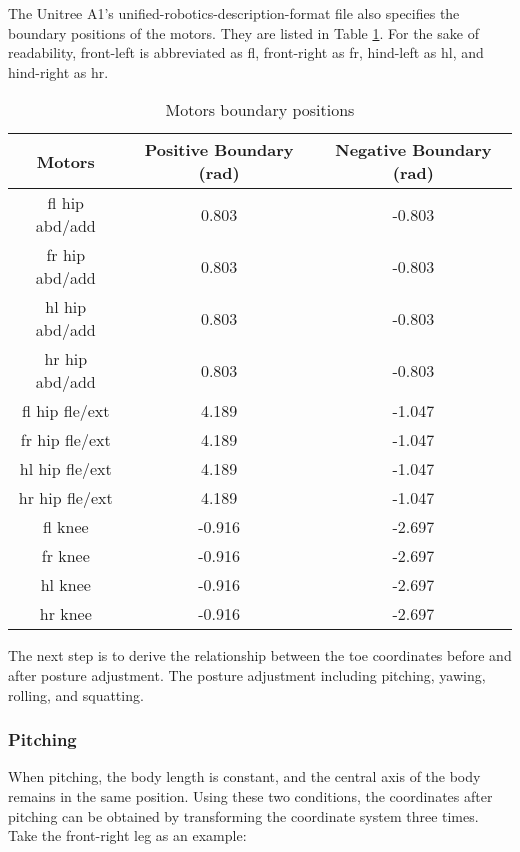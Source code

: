 The Unitree A1's unified-robotics-description-format file also specifies the boundary positions of the motors. They are listed in Table \ref{table:motors_boundary_positions}. For the sake of readability, front-left is abbreviated as fl, front-right as fr, hind-left as hl, and hind-right as hr.

\begin{table}[htbp]
   \centering
   \caption{Motors boundary positions}
   \begin{tabular}{|c|c|c|}
   \hline
   Motors & Positive Boundary (rad) & Negative Boundary (rad) \\ \hline
   fl hip abd/add &  0.803 & -0.803 \\ \hline
   fr hip abd/add &  0.803 & -0.803 \\ \hline
   hl hip abd/add &  0.803 & -0.803 \\ \hline
   hr hip abd/add &  0.803 & -0.803 \\ \hline
   fl hip fle/ext &  4.189 & -1.047 \\ \hline
   fr hip fle/ext &  4.189 & -1.047 \\ \hline
   hl hip fle/ext &  4.189 & -1.047 \\ \hline
   hr hip fle/ext &  4.189 & -1.047 \\ \hline
   fl knee        & -0.916 & -2.697 \\ \hline
   fr knee        & -0.916 & -2.697 \\ \hline
   hl knee        & -0.916 & -2.697 \\ \hline
   hr knee        & -0.916 & -2.697 \\ \hline
   \end{tabular}
   \label{table:motors_boundary_positions}
\end{table}

The next step is to derive the relationship between the toe coordinates before and after posture adjustment. The posture adjustment including pitching, yawing, rolling, and squatting.

\subsubsection{Pitching}

When pitching, the body length is constant, and the central axis of the body remains in the same position. Using these two conditions, the coordinates after pitching can be obtained by transforming the coordinate system three times. Take the front-right leg as an example:

